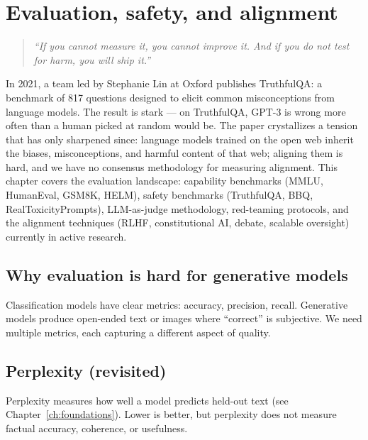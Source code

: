 \chapter{Evaluation, safety, and alignment}
\label{ch:eval-safety}

\begin{quote}
\emph{``If you cannot measure it, you cannot improve it. And if you do not test for harm, you will ship it.''}
\end{quote}

In 2021, a team led by Stephanie Lin at Oxford publishes TruthfulQA: a benchmark of 817 questions designed to elicit common misconceptions from language models. The result is stark --- on TruthfulQA, GPT-3 is wrong more often than a human picked at random would be. The paper crystallizes a tension that has only sharpened since: language models trained on the open web inherit the biases, misconceptions, and harmful content of that web; aligning them is hard, and we have no consensus methodology for measuring alignment. This chapter covers the evaluation landscape: capability benchmarks (MMLU, HumanEval, GSM8K, HELM), safety benchmarks (TruthfulQA, BBQ, RealToxicityPrompts), LLM-as-judge methodology, red-teaming protocols, and the alignment techniques (RLHF, constitutional AI, debate, scalable oversight) currently in active research.

\section{Why evaluation is hard for generative models}

Classification models have clear metrics: accuracy, precision, recall. Generative models produce open-ended text or images where ``correct'' is subjective. We need multiple metrics, each capturing a different aspect of quality.

\section{Perplexity (revisited)}

Perplexity measures how well a model predicts held-out text (see Chapter~\ref{ch:foundations}). Lower is better, but perplexity does not measure factual accuracy, coherence, or usefulness.

